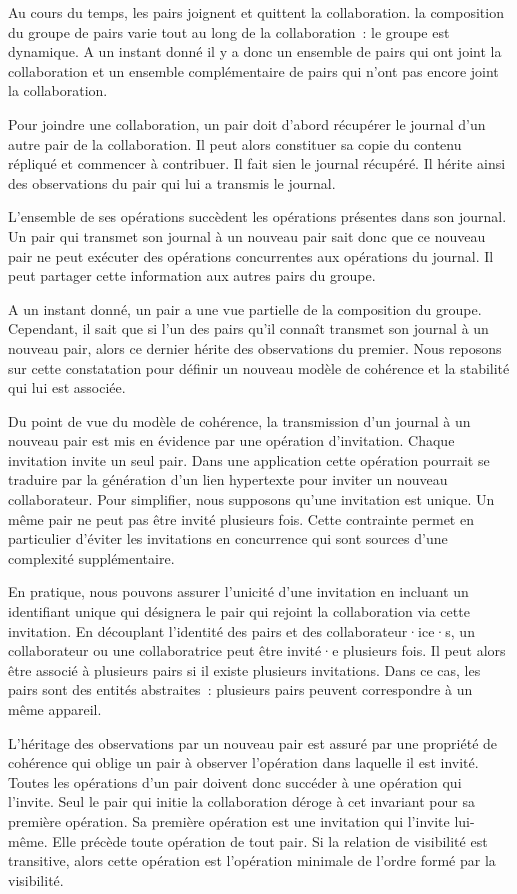 Au cours du temps, les pairs joignent et quittent la collaboration.
la composition du groupe de pairs varie tout au long de la collaboration~: le groupe est dynamique.
A un instant donné il y a donc un ensemble de pairs qui ont joint la collaboration et un ensemble complémentaire de pairs qui n'ont pas encore joint la collaboration.

Pour joindre une collaboration, un pair doit d'abord récupérer le journal d'un autre pair de la collaboration.
Il peut alors constituer sa copie du contenu répliqué et commencer à contribuer.
Il fait sien le journal récupéré.
Il hérite ainsi des observations du pair qui lui a transmis le journal.

L'ensemble de ses opérations succèdent les opérations présentes dans son journal.
Un pair qui transmet son journal à un nouveau pair sait donc que ce nouveau pair ne peut exécuter des opérations concurrentes aux opérations du journal.
Il peut partager cette information aux autres pairs du groupe.

A un instant donné, un pair a une vue partielle de la composition du groupe.
Cependant, il sait que si l'un des pairs qu'il connaît transmet son journal à un nouveau pair, alors ce dernier hérite des observations du premier.
Nous reposons sur cette constatation pour définir un nouveau modèle de cohérence et la stabilité qui lui est associée.

Du point de vue du modèle de cohérence, la transmission d'un journal à un nouveau pair est mis en évidence par une opération d'invitation.
Chaque invitation invite un seul pair.
Dans une application cette opération pourrait se traduire par la génération d'un lien hypertexte pour inviter un nouveau collaborateur.
Pour simplifier, nous supposons qu'une invitation est unique.
Un même pair ne peut pas être invité plusieurs fois.
Cette contrainte permet en particulier d'éviter les invitations en concurrence qui sont sources d'une complexité supplémentaire.

En pratique, nous pouvons assurer l'unicité d'une invitation en incluant un identifiant unique qui désignera le pair qui rejoint la collaboration via cette invitation.
En découplant l'identité des pairs et des collaborateur·ice·s, un collaborateur ou une collaboratrice peut être invité·e plusieurs fois.
Il peut alors être associé à plusieurs pairs si il existe plusieurs invitations.
Dans ce cas, les pairs sont des entités abstraites~: plusieurs pairs peuvent correspondre à un même appareil.

L'héritage des observations par un nouveau pair est assuré par une propriété de cohérence qui oblige un pair à observer l'opération dans laquelle il est invité.
Toutes les opérations d'un pair doivent donc succéder à une opération qui l'invite.
Seul le pair qui initie la collaboration déroge à cet invariant pour sa première opération.
Sa première opération est une invitation qui l'invite lui-même.
Elle précède toute opération de tout pair.
Si la relation de visibilité est transitive, alors cette opération est l'opération minimale de l'ordre formé par la visibilité.

